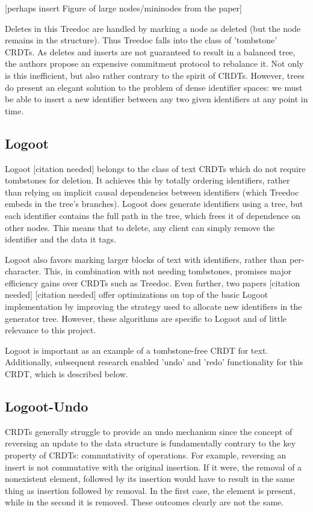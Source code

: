 \documentclass[12pt,a4paper,twoside,openright]{report}
\begin{document}
[perhaps insert Figure of large nodes/mininodes from the paper]

Deletes in this Treedoc are handled by marking a node as deleted (but the node remains in the structure). Thus Treedoc falls into the class of 'tombstone' CRDTs. As deletes and inserts are not guaranteed to result in a balanced tree, the authors propose an expensive commitment protocol to rebalance it. Not only is this inefficient, but also rather contrary to the spirit of CRDTs. However, trees do present an elegant solution to the problem of dense identifier spaces: we must be able to insert a new identifier between any two given identifiers at any point in time.

\subsection{Logoot}

Logoot [citation needed] belongs to the class of text CRDTs which do not require tombstones for deletion. It achieves this by totally ordering identifiers, rather than relying on implicit causal dependencies between identifiers (which Treedoc embeds in the tree's branches). Logoot does generate identifiers using a tree, but each identifier contains the full path in the tree, which frees it of dependence on other nodes. This means that to delete, any client can simply remove the identifier and the data it tags.

Logoot also favors marking larger blocks of text with identifiers, rather than per-character. This, in combination with not needing tombstones, promises major efficiency gains over CRDTs such as Treedoc. Even further, two papers [citation needed] [citation needed] offer optimizations on top of the basic Logoot implementation by improving the strategy used to allocate new identifiers in the generator tree. However, these algorithms are specific to Logoot and of little relevance to this project.

Logoot is important as an example of a tombstone-free CRDT for text. Additionally, subsequent research enabled 'undo' and 'redo' functionality for this CRDT, which is described below.



\subsection{Logoot-Undo}

CRDTs generally struggle to provide an undo mechanism since the concept of reversing an update to the data structure is fundamentally contrary to the key property of CRDTs: commutativity of operations. For example, reversing an insert is not commutative with the original insertion. If it were, the removal of a nonexistent element, followed by its insertion would have to result in the same thing as insertion followed by removal. In the first case, the element is present, while in the second it is removed. These outcomes clearly are not the same.
\end{document}
